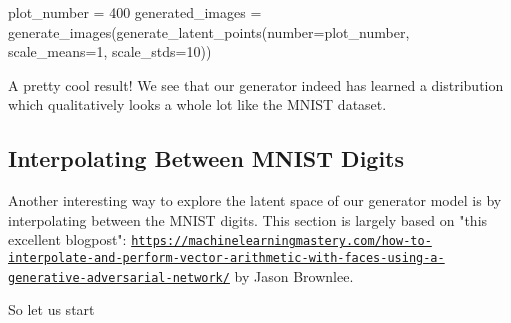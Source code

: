 \documentclass[%
oneside,                 %
final,                   %
10pt]{article}
\begin{document}
\bpycod
plot_number = 400
generated_images = generate_images(generate_latent_points(number=plot_number,
                                                          scale_means=1,
                                                          scale_stds=10))

\epycod

A pretty cool result! We see that our generator indeed has learned a
distribution which qualitatively looks a whole lot like the MNIST dataset.

\subsection{Interpolating Between MNIST Digits}
Another interesting way to explore the latent space of our generator model is by
interpolating between the MNIST digits. This section is largely based on
"this excellent blogpost": \href{{https://machinelearningmastery.com/how-to-interpolate-and-perform-vector-arithmetic-with-faces-using-a-generative-adversarial-network/}}{\nolinkurl{https://machinelearningmastery.com/how-to-interpolate-and-perform-vector-arithmetic-with-faces-using-a-generative-adversarial-network/}}
by Jason Brownlee.

So let us start


\end{document}
